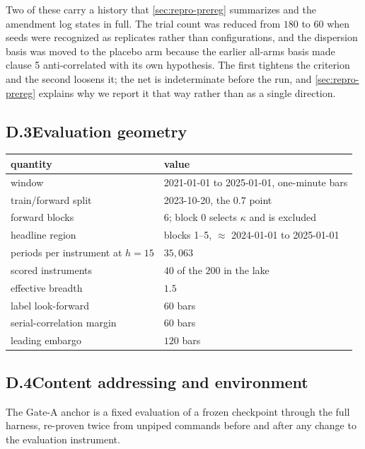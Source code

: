 Two of these carry a history that \cref{sec:repro-prereg} summarizes and the amendment log states
in full. The trial count was reduced from $180$ to $60$ when seeds were recognized as replicates
rather than configurations, and the dispersion basis was moved to the placebo arm because the
earlier all-arms basis made clause 5 anti-correlated with its own hypothesis. The first tightens
the criterion and the second loosens it; the net is indeterminate before the run, and
\cref{sec:repro-prereg} explains why we report it that way rather than as a single direction.

\subsection*{D.3\quad Evaluation geometry}

\begin{center}
\small
\begin{tabularx}{\linewidth}{lX}
\toprule
quantity & value \\
\midrule
window & 2021-01-01 to 2025-01-01, one-minute bars \\
train/forward split & 2023-10-20, the $0.7$ point \\
forward blocks & $6$; block $0$ selects $\kappa$ and is excluded \\
headline region & blocks 1--5, $\approx$ 2024-01-01 to 2025-01-01 \\
periods per instrument at $h=15$ & $35{,}063$ \\
scored instruments & $40$ of the $200$ in the lake \\
effective breadth & $1.5$ \\
label look-forward & $60$ bars \\
serial-correlation margin & $60$ bars \\
leading embargo & $120$ bars \\
\bottomrule
\end{tabularx}
\end{center}

\subsection*{D.4\quad Content addressing and environment}

The Gate-A anchor is a fixed evaluation of a frozen checkpoint through the full harness, re-proven
twice from unpiped commands before and after any change to the evaluation instrument.

